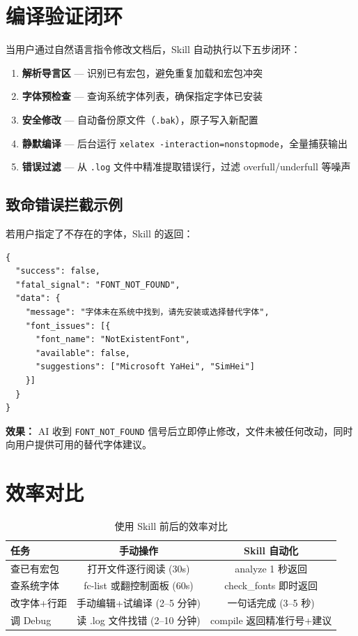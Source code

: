 \documentclass[12pt,a4paper]{ctexart}
\begin{document}
\section{编译验证闭环}

当用户通过自然语言指令修改文档后，Skill 自动执行以下五步闭环：

\begin{enumerate}
    \item \textbf{解析导言区} — 识别已有宏包，避免重复加载和宏包冲突
    \item \textbf{字体预检查} — 查询系统字体列表，确保指定字体已安装
    \item \textbf{安全修改} — 自动备份原文件（\texttt{.bak}），原子写入新配置
    \item \textbf{静默编译} — 后台运行 \texttt{xelatex -interaction=nonstopmode}，全量捕获输出
    \item \textbf{错误过滤} — 从 \texttt{.log} 文件中精准提取错误行，过滤 overfull/underfull 等噪声
\end{enumerate}

\subsection*{致命错误拦截示例}

若用户指定了不存在的字体，Skill 的返回：

\begin{verbatim}
{
  "success": false,
  "fatal_signal": "FONT_NOT_FOUND",
  "data": {
    "message": "字体未在系统中找到，请先安装或选择替代字体",
    "font_issues": [{
      "font_name": "NotExistentFont",
      "available": false,
      "suggestions": ["Microsoft YaHei", "SimHei"]
    }]
  }
}
\end{verbatim}

\noindent \textbf{效果：} AI 收到 \texttt{FONT\_NOT\_FOUND} 信号后立即停止修改，文件未被任何改动，同时向用户提供可用的替代字体建议。

\section{效率对比}

\begin{table}[h]
\centering
\caption{使用 Skill 前后的效率对比}
\begin{tabular}{@{}lcc@{}}
\toprule
\textbf{任务} & \textbf{手动操作} & \textbf{Skill 自动化} \\
\midrule
查已有宏包 & 打开文件逐行阅读 (30s) & analyze 1 秒返回 \\
查系统字体 & fc-list 或翻控制面板 (60s) & check\_fonts 即时返回 \\
改字体+行距 & 手动编辑+试编译 (2--5 分钟) & 一句话完成 (3--5 秒) \\
调 Debug    & 读 .log 文件找错 (2--10 分钟) & compile 返回精准行号+建议 \\
\bottomrule
\end{tabular}
\end{table}
\end{document}

